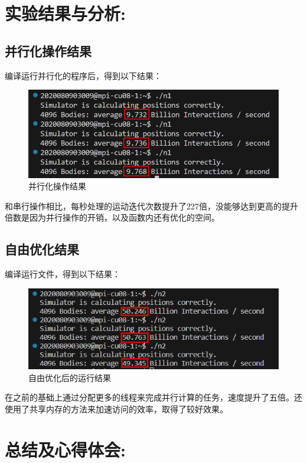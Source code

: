 \documentclass[a4paper,11pt,UTF8]{ctexart}
\begin{document}
\section{实验结果与分析:}
\subsection{并行化操作结果}
编译运行并行化的程序后，得到以下结果：
\begin {figure}[h]
\centering %
\includegraphics[width=\textwidth]{0311-051511.png}
\caption{并行化操作结果} %
\label{five}
\end {figure}

和串行操作相比，每秒处理的运动迭代次数提升了227倍，没能够达到更高的提升倍数是因为并行操作的开销，以及函数内还有优化的空间。

\subsection{自由优化结果}

编译运行文件，得到以下结果：
\begin {figure}[h]
\centering %
\includegraphics[width=\textwidth]{3112-051511.png}
\caption{自由优化后的运行结果} %
\label{five}
\end {figure}

在之前的基础上通过分配更多的线程来完成并行计算的任务，速度提升了五倍。还使用了共享内存的方法来加速访问的效率，取得了较好效果。
\section{总结及心得体会:}
\end{document}
